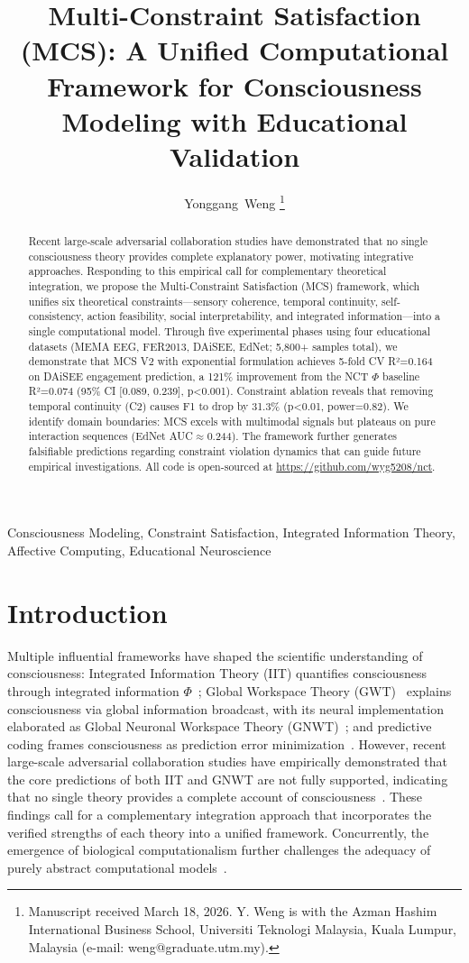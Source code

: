 \documentclass[10pt,journal,compsoc]{IEEEtran}
\title{Multi-Constraint Satisfaction (MCS): A Unified Computational Framework for Consciousness Modeling with Educational Validation}
\author{Yonggang~Weng
\thanks{Manuscript received March 18, 2026. Y. Weng is with the Azman Hashim International Business School, Universiti Teknologi Malaysia, Kuala Lumpur, Malaysia (e-mail: weng@graduate.utm.my).}
}
\begin{document}
\maketitle

\begin{abstract}
Recent large-scale adversarial collaboration studies have demonstrated that no single consciousness theory provides complete explanatory power, motivating integrative approaches. Responding to this empirical call for complementary theoretical integration, we propose the Multi-Constraint Satisfaction (MCS) framework, which unifies six theoretical constraints—sensory coherence, temporal continuity, self-consistency, action feasibility, social interpretability, and integrated information—into a single computational model. Through five experimental phases using four educational datasets (MEMA EEG, FER2013, DAiSEE, EdNet; 5,800+ samples total), we demonstrate that MCS V2 with exponential formulation achieves 5-fold CV R²=0.164 on DAiSEE engagement prediction, a 121\% improvement from the NCT $\Phi$ baseline R²=0.074 (95\% CI [0.089, 0.239], p<0.001). Constraint ablation reveals that removing temporal continuity (C2) causes F1 to drop by 31.3\% (p<0.01, power=0.82). We identify domain boundaries: MCS excels with multimodal signals but plateaus on pure interaction sequences (EdNet AUC$\approx$0.244). The framework further generates falsifiable predictions regarding constraint violation dynamics that can guide future empirical investigations. All code is open-sourced at \url{https://github.com/wyg5208/nct}.
\end{abstract}

\begin{IEEEkeywords}
Consciousness Modeling, Constraint Satisfaction, Integrated Information Theory, Affective Computing, Educational Neuroscience
\end{IEEEkeywords}

\section{Introduction}
\label{sec:introduction}

Multiple influential frameworks have shaped the scientific understanding of consciousness: Integrated Information Theory (IIT) quantifies consciousness through integrated information $\Phi$~\cite{tononi2004,tononi2008,tononi2016}; Global Workspace Theory (GWT)~\cite{baars2005} explains consciousness via global information broadcast, with its neural implementation elaborated as Global Neuronal Workspace Theory (GNWT)~\cite{dehaene2011}; and predictive coding frames consciousness as prediction error minimization~\cite{friston2010}. However, recent large-scale adversarial collaboration studies have empirically demonstrated that the core predictions of both IIT and GNWT are not fully supported, indicating that no single theory provides a complete account of consciousness~\cite{Melloni2025,Storm2024}. These findings call for a complementary integration approach that incorporates the verified strengths of each theory into a unified framework. Concurrently, the emergence of biological computationalism further challenges the adequacy of purely abstract computational models~\cite{Milinkovic2025}.
\end{document}
